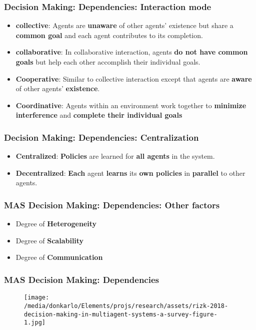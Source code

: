 \documentclass{beamer}
\begin{document}
	\begin{frame}
		\frametitle{Decision Making: Dependencies: Interaction mode}
		\begin{itemize}
			\item \textbf{collective}: Agents are \textbf{unaware} of other agents’ existence but share a \textbf{common goal} and each agent contributes to its completion.  
			
			\item \textbf{collaborative}: In collaborative interaction, agents \textbf{do not have common goals} but help each other accomplish their individual goals.
			
			\item \textbf{Cooperative}: Similar to collective interaction except that agents are \textbf{aware} of other agents’ \textbf{existence}. 
			
			\item \textbf{Coordinative}:  Agents within an environment work together to \textbf{minimize interference} and \textbf{complete their individual goals}
		\end{itemize}
	\end{frame}

	\begin{frame}
		\frametitle{Decision Making: Dependencies: Centralization}
		\begin{itemize}
			\item \textbf{Centralized}: \textbf{Policies} are learned for \textbf{all agents} in the system.
			\item \textbf{Decentralized}: \textbf{Each} agent \textbf{learns} its \textbf{own policies} in \textbf{parallel} to other agents.
		\end{itemize}
	\end{frame}
	
	\begin{frame}
		\frametitle{MAS Decision Making: Dependencies: Other factors}
		\begin{itemize}
			\item Degree of \textbf{Heterogeneity}
			\item Degree of \textbf{Scalability}
			\item Degree of \textbf{Communication}
		\end{itemize}
	\end{frame}

	\begin{frame}
		\frametitle{MAS Decision Making: Dependencies}
		\begin{figure}[h!]
			\centering
			\texttt{[image: /media/donkarlo/Elements/projs/research/assets/rizk-2018-decision-making-in-multiagent-systems-a-survey-figure-1.jpg]}
			\caption{}
			\label{fig:communication-vs-heterogeneity}
		\end{figure}
	\end{frame}
\end{document}
